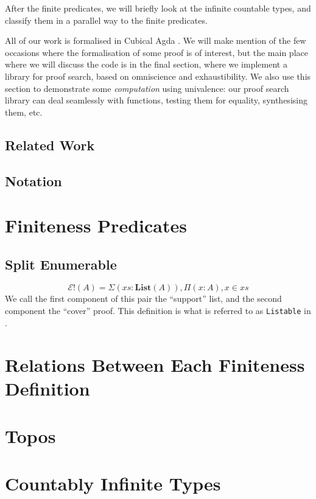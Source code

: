 After the finite predicates, we will briefly look at the infinite countable
types, and classify them in a parallel way to the finite predicates.

All of our work is formalised in Cubical Agda
\cite{vezzosiCubicalAgdaDependently2019}.
We will make mention of the few occasions where the formalisation of some proof
is of interest, but the main place where we will discuss the code is in the
final section, where we implement a library for proof search, based on
omniscience and exhaustibility.
We also use this section to demonstrate some \emph{computation} using
univalence: our proof search library can deal seamlessly with functions, testing
them for equality, synthesising them, etc.
\subsection{Related Work}
\subsection{Notation}

\section{Finiteness Predicates}
\subsection{Split Enumerable}
\begin{rm-definition}
  \begin{equation}
    \mathcal{E}!(A) = \Sigma {(\mathit{xs} : \textbf{List}(A))} , \Pi {(x : A)} , x \in xs
  \end{equation}
  We call the first component of this pair the ``support'' list, and the second
  component the ``cover'' proof.
  This definition is what is referred to as \verb+Listable+ in
  \cite{firsovDependentlyTypedProgramming2015}.
\end{rm-definition}


\section{Relations Between Each Finiteness Definition}
\section{Topos}
\section{Countably Infinite Types}
